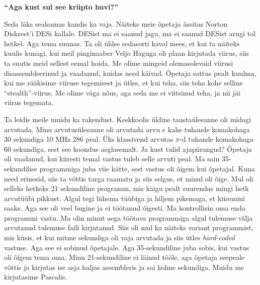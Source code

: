 \textbf{\enquote{Aga kust sul see krüpto huvi?}}

Seda läks sealsamas kandis ka vaja. Näiteks meie õpetaja ässitas Norton
Diskreet'i
DESi kallale. DESist
ma ei saanud jagu, ma ei saanud DESist arugi tol hetkel. Aga tema suunas. Ta
oli üldse sedasorti kaval mees, et kui ta näiteks kuulis kunagi, kui meil
pinginaaber Veljo Haguga oli plaan kirjutada viirus,
siis ta suutis meid sellest eemal hoida. Me olime mingeid olemasolevaid viirusi
disassembleerinud ja vaadanud, kuidas need käivad. Õpetaja sattus pealt kuulma,
kui me rääkisime viiruse tegemisest ja ütles, et kui teha, siis teha kohe
selline \enquote{stealth}-viirus. Me olime väga nõus, aga seda me ei viitsinud
teha, ja nii jäi viirus tegemata.

Ta leidis meile muidu ka rakendust. Keskkoolis üldine taustaülesanne oli midagi
arvutada. Minu arvutusülesanne oli arvutada arvu $e$ kahe tuhande komakohaga 30
sekundiga 10 MHz 286 peal. Üks klassivend arvutas $\pi$-d tuhande komakohaga 60
sekundiga, sest see koondus aeglasemalt. Ja kust tulid ajapiirangud? Õpetaja
oli vaadanud, kui kiiresti temal vastus tuleb selle arvuti peal. Ma sain
35-sekundilise programmiga juba viie kätte, sest vastus oli õigem kui õpetajal.
Kuna need erinesid, siis ta võttis targa raamatu ja siis selgus, et minul oli
õige. Mul oli selleks hetkeks 21 sekundiline programm, mis käigu pealt
suurendas mingi hetk arvutüübi pikkust. Algul tegi lühema tüübiga ja hiljem
pikemaga, et kiiremini saaks. Aga see oli veel bugine ja ei töötanud õigesti.
Ma kontrollisin oma enda programmi vastu. Ma olin minut aega töötava
programmiga algul tulemuse välja arvutanud tulemuse faili kirjutanud. Siis oli
mul ka näiteks variant programmist, mis küsis, et kui mitme sekundiga oli vaja
arvutada ja siis ütles \emph{hard-coded} vastuse. Aga see ei sobinud õpetajale.
Aga 35-sekundiline juba sobis, kui vastus oli õigem tema oma. Minu
21-sekundiline ei läinud tööle, aga õpetaja seepeale võttis ja kirjutas ise
asja haljas assembleris ja sai kolme sekundiga. Muidu
me kirjutasime Pascalis.

